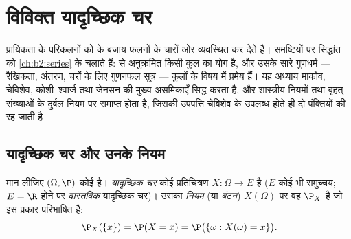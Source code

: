 \chapter{विविक्त यादृच्छिक चर}\label{ch:b2:randomvar}

 प्रायिकता के परिकलनों को  के बजाय फलनों के चारों
ओर व्यवस्थित कर देते हैं।  समष्टियों पर सिद्धांत को \cref{ch:b2:series} के
 चलाते हैं:   से अनुक्रमित किसी
कुल का योग है, और उसके सारे गुणधर्म --- रैखिकता, अंतरण, 
चरों के लिए गुणनफल सूत्र ---  कुलों के विषय में प्रमेय हैं। यह
अध्याय मार्कोव, चेबिशेव, कोशी--श्वार्ज़ तथा जेनसन की मुख्य असमिकाएँ
सिद्ध करता है, और शास्त्रीय नियमों तथा बृहत् संख्याओं के दुर्बल
नियम पर समाप्त होता है, जिसकी उपपत्ति चेबिशेव के उपलब्ध होते ही दो
पंक्तियों की रह जाती है।

\section{यादृच्छिक चर और उनके नियम}

\begin{definition}[विविक्त यादृच्छिक चर; नियम]\label{def:b2:randomvar:law}
मान लीजिए $(\Omega, \P)$ कोई   है। \emph{यादृच्छिक
चर} कोई प्रतिचित्रण $X \colon \Omega \to E$ है ($E$ कोई भी
समुच्चय; $E = \R$ होने पर \emph{वास्तविक} यादृच्छिक चर)। उसका
\emph{नियम} (या
\emph{बंटन})  $X(\Omega)$ पर वह 
$\P_X$ है जो इस प्रकार परिभाषित है:
\[
\P_X(\{x\}) = \P(X = x)
= \P\bigl(\{\omega : X(\omega) = x\}\bigr) .
\]
\end{definition}

